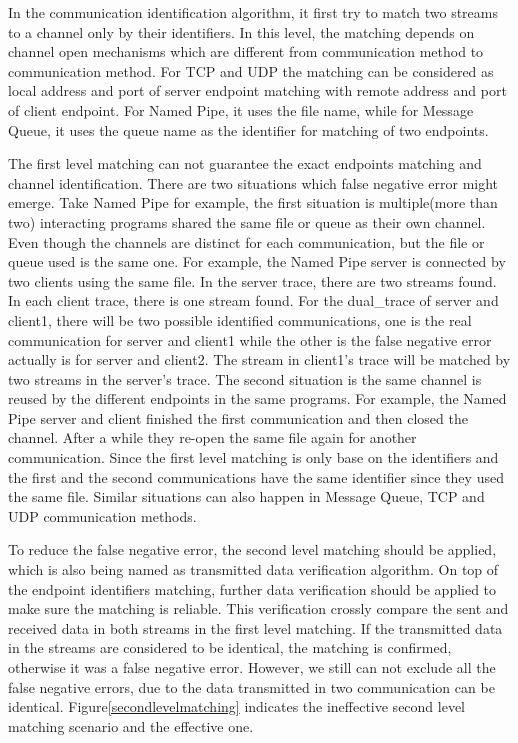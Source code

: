 In the communication identification algorithm, it first try to match two streams to a channel only by their identifiers. In this level, the matching depends on channel open mechanisms which are different from communication method to communication method. For TCP and UDP the matching can be considered as local address and port of server endpoint matching with remote address and port of client endpoint. For Named Pipe, it uses the file name, while for Message Queue, it uses the queue name as the identifier for matching of two endpoints. 

The first level matching can not guarantee the exact endpoints matching and channel identification. There are two situations which false negative error might emerge. Take Named Pipe for example, the first situation is multiple(more than two) interacting programs shared the same file or queue as their own channel. Even though the channels are distinct for each communication, but the file or queue used is the same one. For example, the Named Pipe server is connected by two clients using the same file. In the server trace, there are two streams found. In each client trace, there is one stream found. For the dual\_trace of server and client1, there will be two possible identified communications, one is the real communication for server and client1 while the other is the false negative error actually is for server and client2. The stream in client1's trace will be matched by two streams in the server's trace. The second situation is the same channel is reused by the different endpoints in the same programs. For example, the Named Pipe server and client finished the first communication and then closed the channel. After a while they re-open the same file again for another communication. Since the first level matching is only base on the identifiers and the first and the second communications have the same identifier since they used the same file. Similar situations can also happen in Message Queue, TCP and UDP communication methods. 

To reduce the false negative error, the second level matching should be applied, which is also being named as transmitted data verification algorithm. On top of the endpoint identifiers matching, further data verification should be applied to make sure the matching is reliable. This verification crossly compare the sent and received data in both streams in the first level matching. If the transmitted data in the streams are considered to be identical, the matching is confirmed, otherwise it was a false negative error. However, we still can not exclude all the false negative errors, due to the data transmitted in two communication can be identical. Figure\ref{secondlevelmatching} indicates the ineffective second level matching scenario and the effective one.

